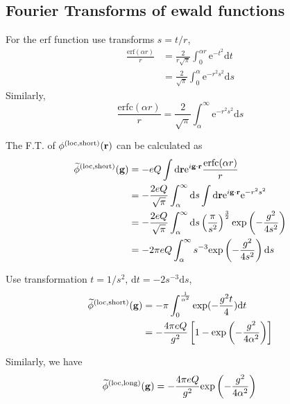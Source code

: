 \documentclass[paper=a4, fontsize=11pt]{article} %
\numberwithin{equation}{section} %
\numberwithin{figure}{section} %
\numberwithin{table}{section} %
\newcommand{\wt}{\widetilde}
\newcommand{\bg}{{\bf{g}}}
\newcommand{\br}{{\bf{r}}}
\newcommand{\rexp}{{\mathrm{exp}}}
\newcommand{\re}{{\mathrm{e}}}
\newcommand{\rshort}{{\mathrm{short}}}
\newcommand{\rlong}{{\mathrm{long}}}
\newcommand{\rerf}{{\mathrm{erf}}}
\newcommand{\rerfc}{{\mathrm{erfc}}}
\newcommand{\rd}{{\mathrm{d}}}
\newcommand{\rlo}{{\mathrm{loc}}}
\newcommand{\ibgr}{i\bg\cdot\br}
\begin{document}
\subsection{Fourier Transforms of ewald functions}
For the $\rerf$ function use transforms $s=t/r$, 
\begin{equation}
\begin{split}
\frac{\rerf(\alpha r)}{r}
&= \frac{2}{r \sqrt{\pi}}\int_0^{\alpha r}\re^{-t^2} \rd t \\
&= \frac{2}{\sqrt{\pi}}\int_0^{\alpha}\re^{-r^2 s^2} \rd s
\end{split}
\end{equation}
Similarly,
\begin{equation}
\frac{\rerfc(\alpha r)}{r}
= \frac{2}{\sqrt{\pi}}\int_\alpha^{\infty} \re^{-r^2 s^2} \rd s
\end{equation}


The F.T. of $\phi^{(\rlo,\rshort)}(\br)$ can be calculated as
\begin{equation}
\begin{split}
\wt{\phi}^{(\rlo,\rshort)}(\bg)
&= -eQ\int \rd\br \re^{\ibgr}\frac{\rerfc(\alpha r)}{r} \\
&= -\frac{2 eQ}{\sqrt{\pi}}\int_\alpha^\infty \rd s \int \rd \br \re^{\ibgr} \re^{-r^2 s^2} \\
&= -\frac{2eQ}{\sqrt{\pi}}\int_\alpha^\infty \rd s \left(\frac{\pi}{s^2}\right)^{\frac{3}{2}}\rexp\left(-\frac{g^2}{4s^2}\right)  \\
&= -2\pi eQ \int_\alpha^\infty s^{-3}\rexp\left(-\frac{g^2}{4s^2}\right) \rd s
\end{split}
\end{equation}

Use transformation $t = 1/s^2$, $\rd t = -2s^{-3} \rd s$,
\begin{equation}
\begin{split}
\wt{\phi}^{(\rlo,\rshort)}(\bg)
&= -\pi \int_0^{\frac{1}{\alpha^2}}\rexp(-\frac{g^2 t}{4}) \rd t \\
&= -\frac{4\pi eQ}{g^2}\left[1-\rexp\left(-\frac{g^2}{4\alpha^2}\right)\right] \\
\end{split}
\end{equation}

Similarly, we have
\begin{equation}
\wt {\phi}^{(\rlo,\rlong)}(\bg)= -\frac{4\pi eQ}{g^2}\rexp\left(-\frac{g^2}{4\alpha^2}\right) \\
\end{equation}
\end{document}

